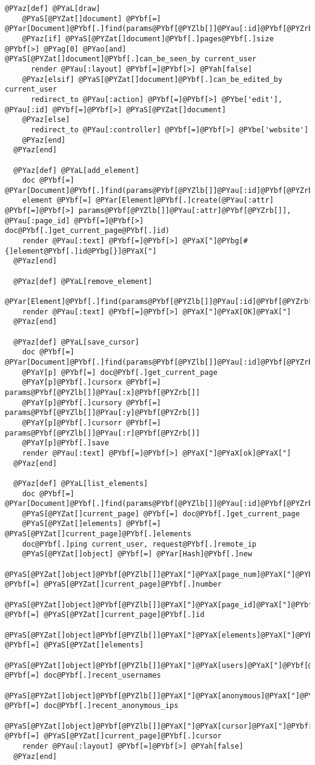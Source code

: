 \begin{Verbatim}[commandchars=@\[\]]
  @PYaz[def] @PYaL[draw]
    @PYaS[@PYZat[]document] @PYbf[=] @PYar[Document]@PYbf[.]find(params@PYbf[@PYZlb[]]@PYau[:id]@PYbf[@PYZrb[]])
    @PYaz[if] @PYaS[@PYZat[]document]@PYbf[.]pages@PYbf[.]size @PYbf[>] @PYag[0] @PYao[and] @PYaS[@PYZat[]document]@PYbf[.]can_be_seen_by current_user
      render @PYau[:layout] @PYbf[=]@PYbf[>] @PYah[false]
    @PYaz[elsif] @PYaS[@PYZat[]document]@PYbf[.]can_be_edited_by current_user
      redirect_to @PYau[:action] @PYbf[=]@PYbf[>] @PYbe['edit'], @PYau[:id] @PYbf[=]@PYbf[>] @PYaS[@PYZat[]document]
    @PYaz[else]
      redirect_to @PYau[:controller] @PYbf[=]@PYbf[>] @PYbe['website']
    @PYaz[end]
  @PYaz[end]
  
  @PYaz[def] @PYaL[add_element]
    doc @PYbf[=] @PYar[Document]@PYbf[.]find(params@PYbf[@PYZlb[]]@PYau[:id]@PYbf[@PYZrb[]])
    element @PYbf[=] @PYar[Element]@PYbf[.]create(@PYau[:attr] @PYbf[=]@PYbf[>] params@PYbf[@PYZlb[]]@PYau[:attr]@PYbf[@PYZrb[]], @PYau[:page_id] @PYbf[=]@PYbf[>] doc@PYbf[.]get_current_page@PYbf[.]id)
    render @PYau[:text] @PYbf[=]@PYbf[>] @PYaX["]@PYbg[#{]element@PYbf[.]id@PYbg[}]@PYaX["]
  @PYaz[end]
  
  @PYaz[def] @PYaL[remove_element]
    @PYar[Element]@PYbf[.]find(params@PYbf[@PYZlb[]]@PYau[:id]@PYbf[@PYZrb[]])@PYbf[.]destroy
    render @PYau[:text] @PYbf[=]@PYbf[>] @PYaX["]@PYaX[OK]@PYaX["]
  @PYaz[end]

  @PYaz[def] @PYaL[save_cursor]
    doc @PYbf[=] @PYar[Document]@PYbf[.]find(params@PYbf[@PYZlb[]]@PYau[:id]@PYbf[@PYZrb[]])
    @PYaY[p] @PYbf[=] doc@PYbf[.]get_current_page
    @PYaY[p]@PYbf[.]cursorx @PYbf[=] params@PYbf[@PYZlb[]]@PYau[:x]@PYbf[@PYZrb[]]
    @PYaY[p]@PYbf[.]cursory @PYbf[=] params@PYbf[@PYZlb[]]@PYau[:y]@PYbf[@PYZrb[]]
    @PYaY[p]@PYbf[.]cursorr @PYbf[=] params@PYbf[@PYZlb[]]@PYau[:r]@PYbf[@PYZrb[]]
    @PYaY[p]@PYbf[.]save
    render @PYau[:text] @PYbf[=]@PYbf[>] @PYaX["]@PYaX[ok]@PYaX["]
  @PYaz[end]

  @PYaz[def] @PYaL[list_elements]
    doc @PYbf[=] @PYar[Document]@PYbf[.]find(params@PYbf[@PYZlb[]]@PYau[:id]@PYbf[@PYZrb[]])
    @PYaS[@PYZat[]current_page] @PYbf[=] doc@PYbf[.]get_current_page
    @PYaS[@PYZat[]elements] @PYbf[=] @PYaS[@PYZat[]current_page]@PYbf[.]elements
    doc@PYbf[.]ping current_user, request@PYbf[.]remote_ip
    @PYaS[@PYZat[]object] @PYbf[=] @PYar[Hash]@PYbf[.]new
    @PYaS[@PYZat[]object]@PYbf[@PYZlb[]]@PYaX["]@PYaX[page_num]@PYaX["]@PYbf[@PYZrb[]] @PYbf[=] @PYaS[@PYZat[]current_page]@PYbf[.]number
    @PYaS[@PYZat[]object]@PYbf[@PYZlb[]]@PYaX["]@PYaX[page_id]@PYaX["]@PYbf[@PYZrb[]] @PYbf[=] @PYaS[@PYZat[]current_page]@PYbf[.]id
    @PYaS[@PYZat[]object]@PYbf[@PYZlb[]]@PYaX["]@PYaX[elements]@PYaX["]@PYbf[@PYZrb[]] @PYbf[=] @PYaS[@PYZat[]elements]
    @PYaS[@PYZat[]object]@PYbf[@PYZlb[]]@PYaX["]@PYaX[users]@PYaX["]@PYbf[@PYZrb[]] @PYbf[=] doc@PYbf[.]recent_usernames
    @PYaS[@PYZat[]object]@PYbf[@PYZlb[]]@PYaX["]@PYaX[anonymous]@PYaX["]@PYbf[@PYZrb[]] @PYbf[=] doc@PYbf[.]recent_anonymous_ips
    @PYaS[@PYZat[]object]@PYbf[@PYZlb[]]@PYaX["]@PYaX[cursor]@PYaX["]@PYbf[@PYZrb[]] @PYbf[=] @PYaS[@PYZat[]current_page]@PYbf[.]cursor
    render @PYau[:layout] @PYbf[=]@PYbf[>] @PYah[false]
  @PYaz[end]


\end{Verbatim}
